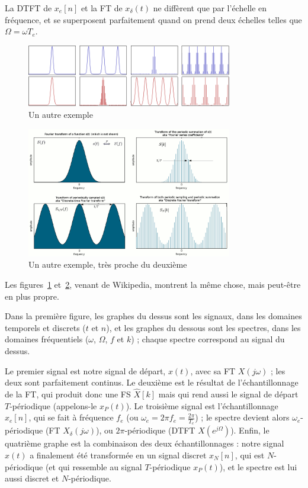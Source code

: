 \documentclass{article}
\begin{document}
La DTFT de $x_e[n]$ et la FT de $x_\delta(t)$ ne diffèrent que par l'échelle en fréquence, et se superposent parfaitement quand on prend deux échelles telles que $\Omega = \omega T_e$.

\begin{figure}
	\centering
	\includegraphics[width=0.8\textwidth]{From_Continuous_To_Discrete_Fourier_Transform.png}
	\caption{Un autre exemple}
	\label{fig:signalspectra2}
\end{figure}
\begin{figure}
	\centering
	\includegraphics[width=0.8\textwidth]{Fourier_transform,_Fourier_series,_DTFT,_DFT.png}
	\caption{Un autre exemple, très proche du deuxième}
	\label{fig:signalspectra3}
\end{figure}

Les figures~\ref{fig:signalspectra2} et~\ref{fig:signalspectra3}, venant de Wikipedia, montrent la même chose, mais peut-être en plus propre.

Dans la première figure, les graphes du dessus sont les signaux, dans les domaines temporels et discrets ($t$ et $n$), et les graphes du dessous sont les spectres, dans les domaines fréquentiels ($\omega$, $\Omega$, $f$ et $k$) ; chaque spectre correspond au signal du dessus.

Le premier signal est notre signal de départ, $x(t)$, avec sa FT $X(j\omega)$ ; les deux sont parfaitement continus. Le deuxième est le résultat de l'échantillonnage de la FT, qui produit donc une FS $\hat{X}[k]$ mais qui rend aussi le signal de départ $T$-périodique (appelons-le $x_P(t)$). Le troisième signal est l'échantillonnage $x_e[n]$, qui se fait à fréquence $f_e$ (ou $\omega_e=2\pi f_e=\frac{2\pi}{T_e}$) ; le spectre devient alors $\omega_e$-périodique (FT $X_\delta(j\omega)$), ou $2\pi$-périodique (DTFT $X\left(e^{j\Omega}\right)$). Enfin, le quatrième graphe est la combinaison des deux échantillonnages : notre signal $x(t)$ a finalement été transformée en un signal discret $x_N[n]$, qui est $N$-périodique (et qui ressemble au signal $T$-périodique $x_P(t)$), et le spectre est lui aussi discret et $N$-périodique.
\end{document}
